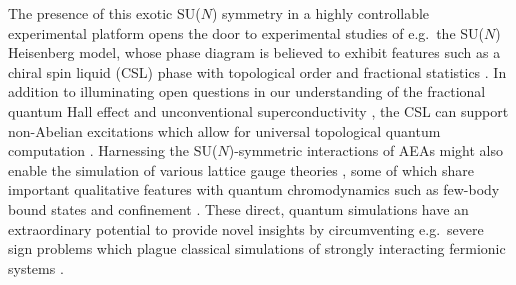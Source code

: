 \documentclass[preprint,showkeys,nofootinbib]{revtex4-1}
\newcommand{\1}{\mathds{1}}
\begin{document}
The presence of this exotic SU($N$) symmetry in a highly controllable
experimental platform opens the door to experimental studies of
e.g.~the SU($N$) Heisenberg model, whose phase diagram is believed to
exhibit features such as a chiral spin liquid (CSL) phase with
topological order and fractional statistics \cite{hermele2009mott,
  hermele2011topological, chen2016syntheticgaugefield}.  In addition
to illuminating open questions in our understanding of the fractional
quantum Hall effect and unconventional superconductivity
\cite{lee2006doping, lee2008high, gong2014emergent}, the CSL can
support non-Abelian excitations which allow for universal topological
quantum computation \cite{freedman2004class, hermele2011topological}.
Harnessing the SU($N$)-symmetric interactions of AEAs might also
enable the simulation of various lattice gauge theories
\cite{wieseu.-j.2013ultracold, zohar2016quantum}, some of which share
important qualitative features with quantum chromodynamics such as
few-body bound states and confinement \cite{banerjee2013atomic,
  rico2018nuclear}.  These direct, quantum simulations have an
extraordinary potential to provide novel insights by circumventing
e.g.~severe sign problems which plague classical simulations of
strongly interacting fermionic systems \cite{wieseu.-j.2013ultracold,
  wu2003exact}.

\end{document}
